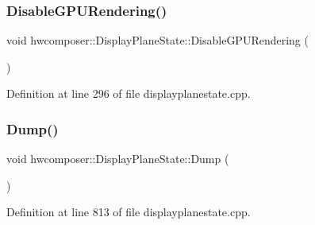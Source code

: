 \subsubsection{\texorpdfstring{Disable\+G\+P\+U\+Rendering()}{DisableGPURendering()}}
{\footnotesize\ttfamily void hwcomposer\+::\+Display\+Plane\+State\+::\+Disable\+G\+P\+U\+Rendering (\begin{DoxyParamCaption}{ }\end{DoxyParamCaption})}



Definition at line 296 of file displayplanestate.\+cpp.


\begin{DoxyCode}{0}
\end{DoxyCode}
\mbox{\label{classhwcomposer_1_1DisplayPlaneState_a620538eec4a6a5dbfd62c5ddb697d95d}} 
\subsubsection{\texorpdfstring{Dump()}{Dump()}}
{\footnotesize\ttfamily void hwcomposer\+::\+Display\+Plane\+State\+::\+Dump (\begin{DoxyParamCaption}{ }\end{DoxyParamCaption})}



Definition at line 813 of file displayplanestate.\+cpp.


